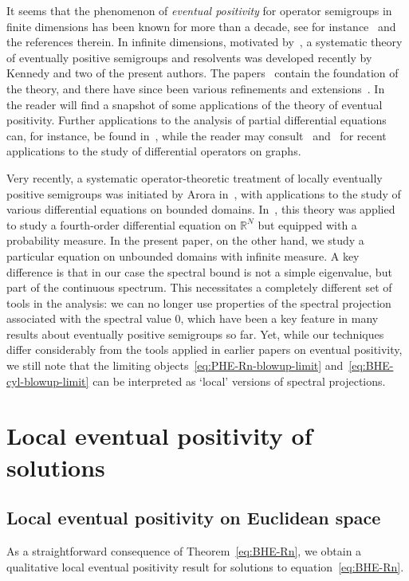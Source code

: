 \documentclass[a4paper, reqno,titlepage]{amsart}
\numberwithin{equation}{section}
\theoremstyle{plain}
\theoremstyle{definition}
\theoremstyle{remark}
\newcommand{\RR}{\mathbb{R}}
\begin{document}
It seems that the phenomenon of \emph{eventual positivity} for operator semigroups in finite dimensions has been known for more than a decade, see for instance~\cite{NT} and the references therein. In infinite dimensions, motivated by~\cite{DD14}, a systematic theory of eventually positive semigroups and resolvents was developed recently by Kennedy and two of the present authors. The papers~\cite{DGK2, DGK1} contain the foundation of the theory, and there have since been various refinements and extensions~\cite{DG17, DG18, DG18-2, ArG20}.  In~\cite[Sections 7, 8]{AG20} the reader will find a snapshot of some applications of the theory of eventual positivity. Further applications to the analysis of partial differential equations can, for instance, be found in~\cite[Section 7]{DKP}, while the reader may consult~\cite[Section 6]{GM} and~\cite[Section 5]{BGM} for recent applications to the study of differential operators on graphs.

Very recently, a systematic operator-theoretic treatment of locally eventually positive semigroups was initiated by Arora in~\cite{Ar21}, with applications to the study of various differential equations on bounded domains. In~\cite{AGRT}, this theory was applied to study a fourth-order differential equation on $\RR^N$ but equipped with a probability measure. In the present paper, on the other hand, we study a particular equation on unbounded domains with infinite measure. A key difference is that in our case the spectral bound is not a simple eigenvalue, but part of the continuous spectrum. This necessitates a completely different set of tools in the analysis: we can no longer use properties of the spectral projection associated with the spectral value $0$, which have been a key feature in many results about eventually positive semigroups so far. Yet, while our techniques differ considerably from the tools applied in earlier papers on eventual positivity, we still note that the limiting objects~\eqref{eq:PHE-Rn-blowup-limit} and~\eqref{eq:BHE-cyl-blowup-limit} can be interpreted as `local' versions of spectral projections.

\section{Local eventual positivity of solutions}
\label{sec:LEP}

\subsection{Local eventual positivity on Euclidean space}
As a straightforward consequence of Theorem~\ref{eq:BHE-Rn}, we obtain a qualitative local eventual positivity result for solutions to equation~\eqref{eq:BHE-Rn}.
\end{document}
